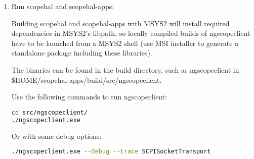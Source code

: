 \begin{enumerate}








\item Run scopehal and scopehal-apps:

Building scopehal and scopehal-apps with MSYS2 will install required dependencies in MSYS2's libpath, so locally
compiled builds of ngscopeclient have to be launched from a MSYS2 shell (use MSI installer to generate a standalone
package including these libraries).

The binaries can be found in the build directory, such as ngscopeclient in \$HOME/scopehal-apps/build/src/ngscopeclient.

Use the following commands to run ngscopeclient:
\begin{lstlisting}[language=sh, numbers=none]
cd src/ngscopeclient/
./ngscopeclient.exe
\end{lstlisting}

Or with some debug options:
\begin{lstlisting}[language=sh, numbers=none]
./ngscopeclient.exe --debug --trace SCPISocketTransport
\end{lstlisting}



\end{enumerate}


